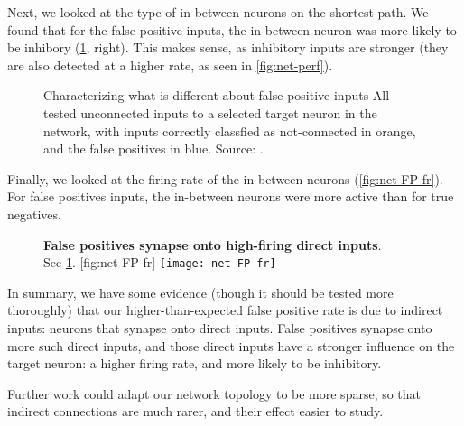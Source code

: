 Next, we looked at the type of in-between neurons on the shortest path. We found that for the false positive inputs, the in-between neuron was more likely to be inhibory (\cref{fig:net-FP}, right). This makes sense, as inhibitory inputs are stronger (they are also detected at a higher rate, as seen in \cref{fig:net-perf}).

\begin{figure}
    \captionn
        {Characterizing what is different about false positive inputs}
        {All tested unconnected inputs to a selected target neuron in the network, with inputs correctly classfied as not-connected in orange, and the false positives in blue. Source: .}
    \label{fig:net-FP}
\end{figure}


Finally, we looked at the firing rate of the in-between neurons (\cref{fig:net-FP-fr}). For false positives inputs, the in-between neurons were more active than for true negatives.


\begin{figure}
    \begin{sidecaption}
        {\textbf{False positives synapse onto high-firing direct inputs}.\\
        See \cref{fig:net-FP}.}
        [fig:net-FP-fr]
        \texttt{[image: net-FP-fr]}
    \end{sidecaption}
\end{figure}




In summary, we have some evidence (though it should be tested more thoroughly) that our higher-than-expected false positive rate is due to indirect inputs: neurons that synapse onto direct inputs. False positives synapse onto more such direct inputs, and those direct inputs have a stronger influence on the target neuron: a higher firing rate, and more likely to be inhibitory.

Further work could adapt our network topology to be more sparse, so that indirect connections are much rarer, and their effect easier to study.




